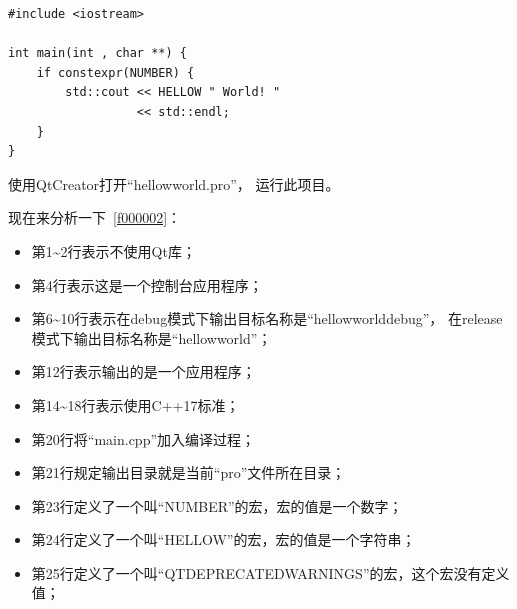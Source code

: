 \begin{lstlisting}[label=f000003,
caption=GoodLuck,
title=\lstlistingname\ \thelstlisting
]
#include <iostream>

int main(int , char **) {
    if constexpr(NUMBER) {
        std::cout << HELLOW " World! "
                  << std::endl;
    }
}
\end{lstlisting}          %


使用QtCreator打开“hellow\underline{\hspace{0.5em}}world.pro”，
运行此项目。

现在来分析一下\lstlistingname\ \ref{f000002}：
\begin{itemize}
\item 第1\~{}2行表示不使用Qt库；
\item 第4行表示这是一个控制台应用程序；
\item 第6\~{}10行表示在debug模式下输出目标名称是“hellow\underline{\hspace{0.5em}}world\underline{\hspace{0.5em}}debug”，
在release模式下输出目标名称是“hellow\underline{\hspace{0.5em}}world”；
\item 第12行表示输出的是一个应用程序；
\item 第14\~{}18行表示使用C++17标准；
\item 第20行将“main.cpp”加入编译过程；
\item 第21行规定输出目录就是当前“pro”文件所在目录；
\item 第23行定义了一个叫“NUMBER”的宏，宏的值是一个数字；
\item 第24行定义了一个叫“HELLOW”的宏，宏的值是一个字符串；
\item 第25行定义了一个叫“QT\underline{\hspace{0.5em}}DEPRECATED\underline{\hspace{0.5em}}WARNINGS”的宏，这个宏没有定义值；
\end{itemize}

